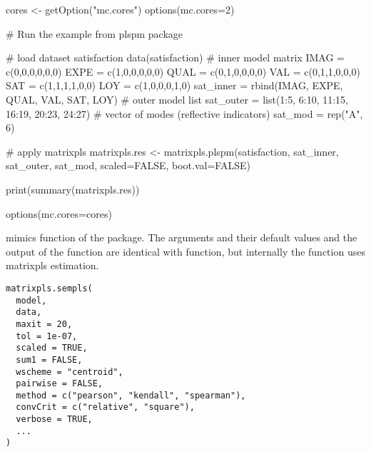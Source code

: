 \documentclass[a4paper]{book}
\begin{document}
%
\begin{Examples}
\begin{ExampleCode}
cores <- getOption("mc.cores")
options(mc.cores=2)

# Run the example from plspm package

# load dataset satisfaction
data(satisfaction)
# inner model matrix
IMAG = c(0,0,0,0,0,0)
EXPE = c(1,0,0,0,0,0)
QUAL = c(0,1,0,0,0,0)
VAL = c(0,1,1,0,0,0)
SAT = c(1,1,1,1,0,0)
LOY = c(1,0,0,0,1,0)
sat_inner = rbind(IMAG, EXPE, QUAL, VAL, SAT, LOY)
# outer model list
sat_outer = list(1:5, 6:10, 11:15, 16:19, 20:23, 24:27)
# vector of modes (reflective indicators)
sat_mod = rep("A", 6)

# apply matrixpls
matrixpls.res <- matrixpls.plspm(satisfaction, sat_inner, sat_outer, sat_mod,
                                 scaled=FALSE, boot.val=FALSE)

print(summary(matrixpls.res))

options(mc.cores=cores)

\end{ExampleCode}
\end{Examples}
%
\begin{Description}\relax
{} mimics  function of the  package.
The arguments and their default values and the output of the function are identical with  function,
but internally the function uses matrixpls estimation.
\end{Description}
%
\begin{Usage}
\begin{verbatim}
matrixpls.sempls(
  model,
  data,
  maxit = 20,
  tol = 1e-07,
  scaled = TRUE,
  sum1 = FALSE,
  wscheme = "centroid",
  pairwise = FALSE,
  method = c("pearson", "kendall", "spearman"),
  convCrit = c("relative", "square"),
  verbose = TRUE,
  ...
)
\end{verbatim}
\end{Usage}
%
\end{document}
